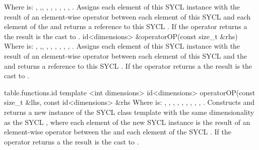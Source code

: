     {
      Where  is: \codeinline{+=}, \codeinline{-=},\codeinline{
      *=}, \codeinline{/=}, \codeinline{\%=}, \codeinline{<<=}, \codeinline{
      >>=}, \codeinline{\&=}, \codeinline{|=}, \codeinline{^=}.
      \newline
      Assigns each element of this SYCL  instance with the
      result of an element-wise  operator between each element
      of this SYCL  and each element of the 
       and returns a reference to this SYCL . If
      the operator returns a  the result is the cast to
      .
    }
  \addRow
    { id<dimensions> \&operatorOP(const size_t \&rhs) }
    {
      Where  is: \codeinline{+=}, \codeinline{-=},\codeinline{
      *=}, \codeinline{/=}, \codeinline{\%=}, \codeinline{<<=}, \codeinline{
      >>=}, \codeinline{\&=}, \codeinline{|=}, \codeinline{^=}.
      \newline
      Assigns each element of this SYCL  instance with the
      result of an element-wise  operator between each element
      of this SYCL  and the  
      and returns a reference to this SYCL . If the operator
      returns a  the result is the cast to .
    }
\completeTable

{table.functions.id}
  \addRowThreeL
    { template <int dimensions> }
    { id<dimensions> operatorOP(const size_t \&lhs, }
    { const id<dimensions> \&rhs }
    {
      Where  is: \codeinline{+}, \codeinline{-}, \codeinline{*},
      \codeinline{/}, \codeinline{\%}, \codeinline{<<}, \codeinline{>>},
      \codeinline{\&}, \codeinline{|}, \codeinline{^}.
      \newline
      Constructs and returns a new instance of the SYCL  class
      template with the same dimensionality as the  SYCL
      , where each element of the new SYCL 
      instance is the result of an element-wise  operator between
      the   and each element of the
       SYCL . If the operator returns a
       the result is the cast to .
    }
\completeTable

